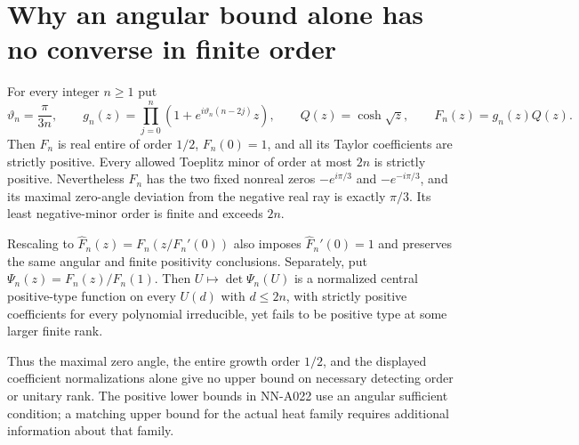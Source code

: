 \section{Why an angular bound alone has no converse in finite order}
\label{sec:analytic-angle-only-obstruction}

\begin{theorem}
For every integer $n\ge1$ put
\[
 \vartheta_n=\frac{\pi}{3n},\qquad
 g_n(z)=\prod_{j=0}^{n}
                (1+e^{i\vartheta_n(n-2j)}z),\qquad
 Q(z)=\cosh\sqrt z,\qquad F_n(z)=g_n(z)Q(z).
\]
Then $F_n$ is real entire of order $1/2$, $F_n(0)=1$, and all
its Taylor coefficients are strictly positive. Every allowed
Toeplitz minor of order at most $2n$ is strictly positive.
Nevertheless $F_n$ has the two fixed nonreal zeros
$-e^{i\pi/3}$ and $-e^{-i\pi/3}$, and its maximal zero-angle
deviation from the negative real ray is exactly $\pi/3$.
Its least negative-minor order is finite and exceeds $2n$.

Rescaling to $\widehat F_n(z)=F_n(z/F_n'(0))$ also imposes
$\widehat F_n'(0)=1$ and preserves the same angular and finite
positivity conclusions. Separately, put
$\Psi_n(z)=F_n(z)/F_n(1)$. Then
$U\mapsto\det\Psi_n(U)$ is a normalized central positive-type
function on every $U(d)$ with $d\le2n$, with strictly positive
coefficients for every polynomial irreducible, yet fails to be
positive type at some larger finite rank.

Thus the maximal zero angle, the entire growth order $1/2$,
and the displayed coefficient normalizations alone give no
upper bound on necessary detecting order or unitary rank.
The positive lower bounds in NN-A022 use an angular sufficient
condition; a matching upper bound for the actual heat family
requires additional information about that family.
\end{theorem}

